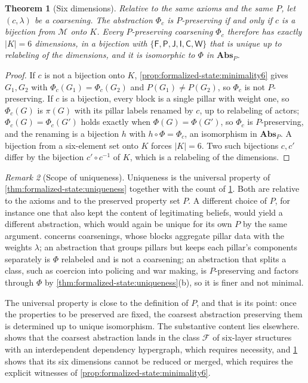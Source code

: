 \documentclass[11pt,letterpaper]{article}
\newtheorem{theorem}{Theorem}[section]
\theoremstyle{definition}
\theoremstyle{remark}
\newtheorem{remark}[theorem]{Remark}
\newcommand{\pF}{\mathsf{F}}
\newcommand{\pP}{\mathsf{P}}
\newcommand{\pJ}{\mathsf{J}}
\newcommand{\pI}{\mathsf{I}}
\newcommand{\pC}{\mathsf{C}}
\newcommand{\pW}{\mathsf{W}}
\newcommand{\Mset}{\mathcal{M}}
\begin{document}
\begin{theorem}[Six dimensions]
\label{thm:formalized-state:six}
Relative to the same axioms and the same $P$, let $(c,\lambda)$ be a coarsening. The abstraction $\Phi_c$ is $P$-preserving if and only if $c$ is a bijection from $\Mset$ onto $K$. Every $P$-preserving coarsening $\Phi_c$ therefore has exactly $|K|=6$ dimensions, in a bijection with $\{\pF,\pP,\pJ,\pI,\pC,\pW\}$ that is unique up to relabeling of the dimensions, and it is isomorphic to $\Phi$ in $\mathbf{Abs}_P$.
\end{theorem}

\begin{proof}
If $c$ is not a bijection onto $K$, \cref{prop:formalized-state:minimality6} gives $G_1,G_2$ with $\Phi_c(G_1)=\Phi_c(G_2)$ and $P(G_1)\neq P(G_2)$, so $\Phi_c$ is not $P$-preserving. If $c$ is a bijection, every block is a single pillar with weight one, so $\Phi_c(G)$ is $\pi(G)$ with its pillar labels renamed by $c$, up to relabeling of actors; $\Phi_c(G)=\Phi_c(G')$ holds exactly when $\Phi(G)=\Phi(G')$, so $\Phi_c$ is $P$-preserving, and the renaming is a bijection $h$ with $h\circ\Phi=\Phi_c$, an isomorphism in $\mathbf{Abs}_P$. A bijection from a six-element set onto $K$ forces $|K|=6$. Two such bijections $c,c'$ differ by the bijection $c'\circ c^{-1}$ of $K$, which is a relabeling of the dimensions.
\end{proof}

\begin{remark}[Scope of uniqueness]
\label{rem:formalized-state:scope}
Uniqueness is the universal property of \cref{thm:formalized-state:uniqueness} together with the count of \cref{thm:formalized-state:six}. Both are relative to the axioms and to the preserved property set $P$. A different choice of $P$, for instance one that also kept the content of legitimating beliefs, would yield a different abstraction, which would again be unique for its own $P$ by the same argument.  concerns coarsenings, whose blocks aggregate pillar data with the weights $\lambda$; an abstraction that groups pillars but keeps each pillar's components separately is $\Phi$ relabeled and is not a coarsening; an abstraction that splits a class, such as coercion into policing and war making, is $P$-preserving and factors through $\Phi$ by \cref{thm:formalized-state:uniqueness}(b), so it is finer and not minimal.
\end{remark}

The universal property is close to the definition of $P$, and that is its point: once the properties to be preserved are fixed, the coarsest abstraction preserving them is determined up to unique isomorphism. The substantive content lies elsewhere.  shows that the coarsest abstraction lands in the class $\mathcal{F}$ of six-layer structures with an interdependent dependency hypergraph, which requires necessity, and \cref{thm:formalized-state:six} shows that its six dimensions cannot be reduced or merged, which requires the explicit witnesses of \cref{prop:formalized-state:minimality6}.
\end{document}
